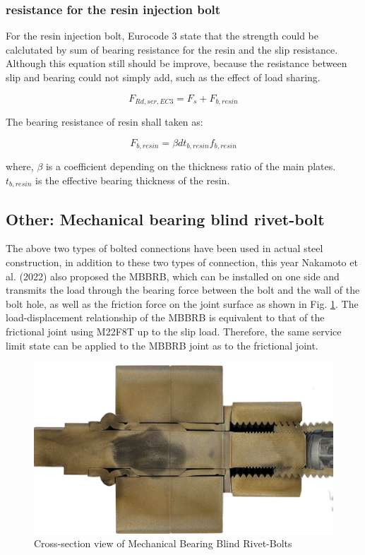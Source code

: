 \subsubsection{resistance for the resin injection bolt}

For the resin injection bolt, Eurocode 3 state that the strength could be calclutated by sum of 
bearing resistance for the resin and the slip resistance. Although this equation still should be improve, because the resistance between slip and bearing could not simply add, such as the effect of load sharing.


\begin{equation}
    F_{Rd,ser,EC3}=F_s+F_{b,resin}
\end{equation}   

The bearing resistance of resin shall taken as:

\begin{equation}
    F_{b,resin}=\beta dt_{b,resin}f_{b,resin}
\end{equation}

where, $\beta$ is a coefficient depending on the thickness ratio of the main plates. $t_{b,resin}$ is the effective bearing thickness of the resin. 


\subsection{Other: Mechanical bearing blind rivet-bolt}

The above two types of bolted connections have been used in actual steel construction, in addition to these two types of connection, this year Nakamoto et al. (2022) \cite{Nakamoto2022MBBRB} also proposed the \ac{MBBRB}, which can be installed on one side and transmits the load through the bearing force between the bolt and the wall of the bolt hole, as well as the friction force on the joint surface as shown in Fig. \ref{fig-MBBRB}. The load-displacement relationship of the \ac{MBBRB} is equivalent to that of the frictional joint using M22F8T up to the slip load. Therefore, the same service limit state can be applied to the MBBRB joint as to the frictional joint.


\begin{figure}[htbp]
    \centering
    \includegraphics[width=0.85\linewidth]{imgs//ch2/onesidebearingbolt.jpg}
    \caption{Cross-section view of Mechanical Bearing Blind Rivet-Bolts}
    \label{fig-MBBRB}
\end{figure}


